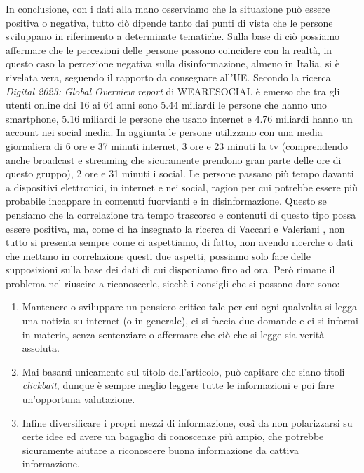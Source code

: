 \documentclass{article}
\begin{document}
\begin{justify}
    In conclusione, con i dati alla mano osserviamo che la situazione può essere positiva o negativa, tutto ciò dipende tanto dai punti di vista che le persone sviluppano in riferimento a determinate tematiche. Sulla base di ciò possiamo affermare che le percezioni delle persone possono coincidere con la realtà, in questo caso la percezione negativa sulla disinformazione, almeno in Italia, si è rivelata vera, seguendo il rapporto da consegnare all'UE.
    Secondo la ricerca \textit{Digital 2023: Global Overview report} di WEARESOCIAL è emerso che tra gli utenti online dai 16 ai 64 anni sono 5.44 miliardi le persone che hanno uno smartphone, 5.16 miliardi le persone che usano internet e 4.76 miliardi hanno un account nei social media. In aggiunta le persone utilizzano con una media giornaliera di 6 ore e 37 minuti internet, 3 ore e 23 minuti la tv (comprendendo anche broadcast e streaming che sicuramente prendono gran parte delle ore di questo gruppo), 2 ore e 31 minuti i social.\citep{WEARESOCIAL}
    Le persone passano più tempo davanti a dispositivi elettronici, in internet e nei social, ragion per cui potrebbe essere più probabile incappare in contenuti fuorvianti e in disinformazione. Questo se pensiamo che la correlazione tra tempo trascorso e contenuti di questo tipo possa essere positiva, ma, come ci ha insegnato la ricerca di Vaccari e Valeriani \citep{vaccari_outside_2021}, non tutto si presenta sempre come ci aspettiamo, di fatto, non avendo ricerche o dati che mettano in correlazione questi due aspetti, possiamo solo fare delle supposizioni sulla base dei dati di cui disponiamo fino ad ora.
    Però rimane il problema nel riuscire a riconoscerle, sicchè i consigli che si possono dare sono:
    \begin{enumerate}
    \item Mantenere o sviluppare un pensiero critico tale per cui ogni qualvolta si legga una notizia su internet (o in generale), ci si faccia due domande e ci si informi in materia, senza sentenziare o affermare che ciò che si legge sia verità assoluta.
    \item Mai basarsi unicamente sul titolo dell'articolo, può capitare che siano titoli \textit{clickbait}, dunque è sempre meglio leggere tutte le informazioni e poi fare un'opportuna valutazione.
    \item Infine diversificare i propri mezzi di informazione, così da non polarizzarsi su certe idee ed avere un bagaglio di conoscenze più ampio, che potrebbe sicuramente aiutare a riconoscere buona informazione da cattiva informazione.
    \end{enumerate}
\end{justify}

\begin{justify}
    
    
\end{justify}
\end{document}
